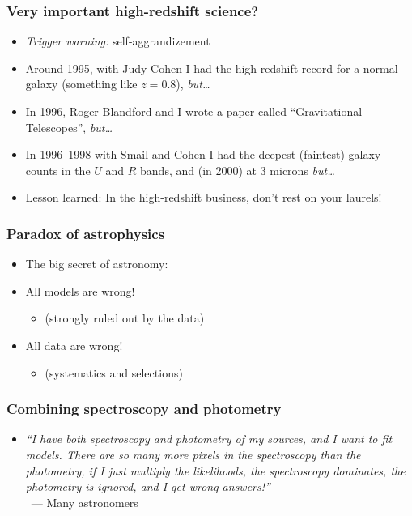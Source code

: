 \documentclass[pdftex]{beamer}
\begin{document}
\begin{frame}
  \frametitle{Very important high-redshift science?}
  \begin{itemize}
  \item<1> \textit{Trigger warning:} self-aggrandizement
  \item<2-> Around 1995, with Judy Cohen I had the high-redshift record
    for a normal galaxy (something like $z=0.8$), \emph{but\ldots}
  \item<2-> In 1996, Roger Blandford and I wrote a paper called
    ``Gravitational Telescopes'', \emph{but\ldots}
  \item<2-> In 1996--1998 with Smail and Cohen I had the deepest
    (faintest) galaxy counts in the $U$ and $R$ bands, and (in 2000)
    at 3 microns \emph{but\ldots}
  \item<3> Lesson learned: In the high-redshift business, don't rest on
    your laurels!
  \end{itemize}
\end{frame}

\begin{frame}
  \frametitle{Paradox of astrophysics}
  \begin{itemize}
  \item The big secret of astronomy:
  \item<2-> All models are wrong!
    \begin{itemize}
    \item (strongly ruled out by the data)
    \end{itemize}
  \item<3> All data are wrong!
    \begin{itemize}
    \item (systematics and selections)
    \end{itemize}
  \end{itemize}
\end{frame}

\begin{frame}
  \frametitle{Combining spectroscopy and photometry}
  \begin{itemize}
  \item \textit{``I have both spectroscopy and photometry of my sources, and I
    want to fit models. There are so many more pixels in the
    spectroscopy than the photometry, if I just multiply the
    likelihoods, the spectroscopy dominates, the photometry is
    ignored, and I get wrong answers!''} \\ ~\hfill --- Many
    astronomers
  \end{itemize}
\end{frame}
\end{document}
